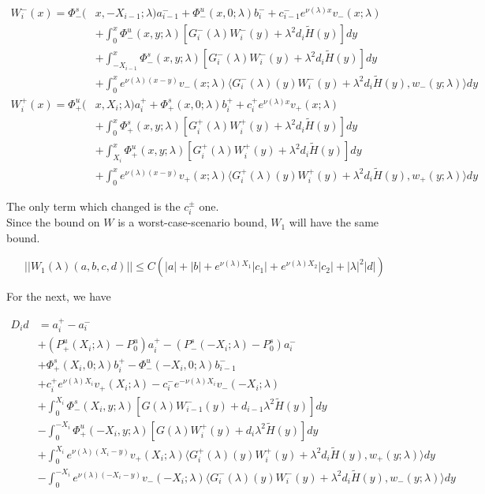 \documentclass[12pt]{article}
\begin{document}
\begin{enumerate}
\begin{align*}
W_i^-(x) = \Phi^s_-(&x, -X_{i-1}; \lambda)a_{i-1}^- + \Phi^u_-(x, 0; \lambda)b_i^- + c_{i-1}^- e^{\nu(\lambda)x} v_-(x; \lambda) \\
&+ \int_0^x \Phi^u_-(x, y; \lambda)[ G_i^-(\lambda)W_i^-(y) + \lambda^2 d_i \tilde{H}(y) ] dy \\
&+ \int_{-X_{i-1}}^x \Phi^s_-(x, y; \lambda) [ G_i^-(\lambda)W_i^-(y) + \lambda^2 d_i \tilde{H}(y) ] dy \\
&+ \int_{0}^x 
e^{\nu(\lambda)(x-y)} v_-(x; \lambda) \langle G_i^-(\lambda)(y)W_i^-(y) + \lambda^2 d_i \tilde{H}(y), w_-(y; \lambda) \rangle dy \\
W_i^+(x) = \Phi^u_+(&x, X_i; \lambda)a_i^+ + \Phi^s_+(x, 0; \lambda)b_i^+ + c_i^+ e^{\nu(\lambda)x} v_+(x; \lambda) \\
&+ \int_0^x \Phi^s_+(x, y; \lambda) [ G_i^+(\lambda)W_i^+(y) + \lambda^2 d_i \tilde{H}(y) ] dy \\
&+ \int_{X_i}^x \Phi^u_+(x, y; \lambda) [ G_i^+(\lambda)W_i^+(y) + \lambda^2 d_i \tilde{H}(y) ] dy \\
&+ \int_{0}^x e^{\nu(\lambda)(x-y)} v_+(x; \lambda) \langle G_i^+(\lambda)(y)W_i^+(y) + \lambda^2 d_i \tilde{H}(y), w_+(y; \lambda) \rangle dy
\end{align*}

The only term which changed is the $c_i^\pm$ one.\\

Since the bound on $W$ is a worst-case-scenario bound, $W_1$ will have the same bound.

\[
||W_1(\lambda)(a,b,c,d)|| \leq C (|a| + |b| + e^{\nu(\lambda)X_1}|c_1| + e^{\nu(\lambda)X_2}|c_2| + |\lambda|^2 |d| )
\]

For the next, we have

\begin{align*}
D_i d &= a_i^+ - a_i^- \\
&+ (P^u_+(X_i; \lambda) - P_0^u)a_i^+ - (P^s_-(-X_i; \lambda) - P_0^s)a_i^- \\
&+ \Phi^s_+(X_i, 0; \lambda)b_i^+ - \Phi^u_-(-X_i, 0; \lambda)b_{i-1}^- \\
&+ c_i^+ e^{\nu(\lambda)X_i} v_+(X_i; \lambda) - c_i^- e^{-\nu(\lambda)X_i} v_-(-X_i; \lambda)\\
&+ \int_0^{X_i} \Phi^s_-(X_i, y; \lambda) [ G(\lambda)W_{i-1}^-(y) + d_{i-1} \lambda^2 \tilde{H}(y) ] dy \\
&- \int_0^{-X_i} \Phi^u_+(-X_i, y; \lambda) [ G(\lambda)W_i^+(y) + d_i \lambda^2 \tilde{H}(y) ] dy \\
&+ \int_{0}^{X_i} e^{\nu(\lambda)(X_i-y)} v_+(X_i; \lambda) \langle G_i^+(\lambda)(y)W_i^+(y) + \lambda^2 d_i \tilde{H}(y), w_+(y; \lambda) \rangle dy \\
&- \int_{0}^{-X_i} 
e^{\nu(\lambda)(-X_i-y)} v_-(-X_i; \lambda) \langle G_i^-(\lambda)(y)W_i^-(y) + \lambda^2 d_i \tilde{H}(y), w_-(y; \lambda) \rangle dy
\end{align*}


\end{enumerate}
\end{document}
